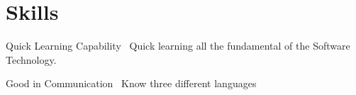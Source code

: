 \documentclass[]{cv-style}
\begin{document}

\section{Skills}
  \vspace{-0.2cm}

\begin{entrylist}

\entry
  {}
  {Quick Learning Capability }
  {}
  {\jobtitle{}\  Quick learning all the fundamental of the Software Technology.}
  
  \entry
  {}
  { Good in Communication}
  {}
  {\jobtitle{}\ Know three different languages }

  

\end{entrylist}
\end{document}
